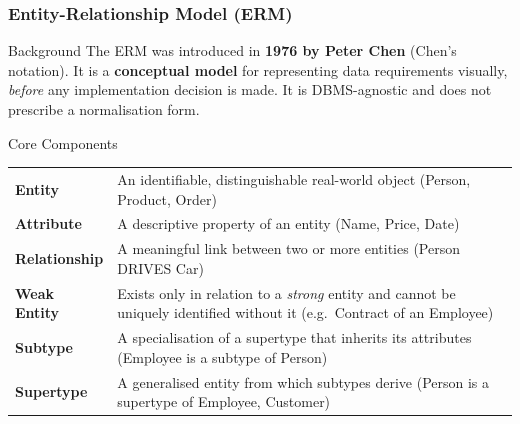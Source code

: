 \begin{frame}
  \frametitle{Entity-Relationship Model (ERM)}

  \begin{block}{Background}
    The ERM was introduced in \textbf{1976 by Peter Chen} (Chen's notation). It is a \textbf{conceptual model} for representing data requirements visually, \textit{before} any implementation decision is made. It is DBMS-agnostic and does not prescribe a normalisation form.
  \end{block}

  \begin{block}{Core Components}
    \renewcommand{\arraystretch}{1.3}
    \begin{tabular}{@{}lp{7.5cm}@{}}
      \textbf{Entity}       & An identifiable, distinguishable real-world object (Person, Product, Order) \\
      \textbf{Attribute}    & A descriptive property of an entity (Name, Price, Date) \\
      \textbf{Relationship} & A meaningful link between two or more entities (Person DRIVES Car) \\
      \textbf{Weak Entity}  & Exists only in relation to a \textit{strong} entity and cannot be uniquely identified without it (e.g.\ Contract of an Employee) \\
      \textbf{Subtype}      & A specialisation of a supertype that inherits its attributes (Employee is a subtype of Person) \\
      \textbf{Supertype}    & A generalised entity from which subtypes derive (Person is a supertype of Employee, Customer) \\
    \end{tabular}
  \end{block}
\end{frame}


